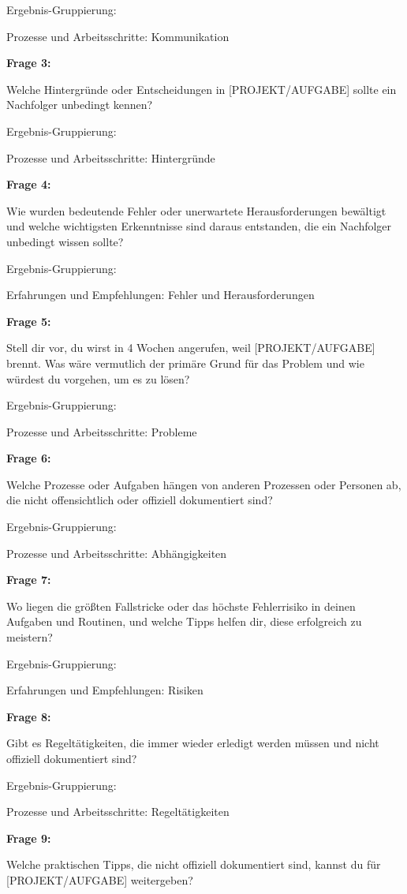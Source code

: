 \documentclass[
  10pt,
  ngerman,
  a4paper,
  toc=graduated,
  numbers=noenddot,
  headings=standardclasses,
  nonumberlist
]{scrartcl}
\begin{document}
Ergebnis-Gruppierung:

Prozesse und Arbeitsschritte: Kommunikation

\textbf{Frage 3:}

Welche Hintergründe oder Entscheidungen in [PROJEKT/AUFGABE] sollte ein Nachfolger unbedingt kennen?

Ergebnis-Gruppierung:

Prozesse und Arbeitsschritte: Hintergründe

\textbf{Frage 4:}

Wie wurden bedeutende Fehler oder unerwartete Herausforderungen bewältigt und welche wichtigsten Erkenntnisse sind daraus entstanden, die ein Nachfolger unbedingt wissen sollte?

Ergebnis-Gruppierung:

Erfahrungen und Empfehlungen: Fehler und Herausforderungen

\textbf{Frage 5:}

Stell dir vor, du wirst in 4 Wochen angerufen, weil [PROJEKT/AUFGABE] brennt. Was wäre vermutlich der primäre Grund für das Problem und wie würdest du vorgehen, um es zu lösen?

Ergebnis-Gruppierung:

Prozesse und Arbeitsschritte: Probleme

\textbf{Frage 6:}

Welche Prozesse oder Aufgaben hängen von anderen Prozessen oder Personen ab, die nicht offensichtlich oder offiziell dokumentiert sind?

Ergebnis-Gruppierung:

Prozesse und Arbeitsschritte: Abhängigkeiten

\textbf{Frage 7:}

Wo liegen die größten Fallstricke oder das höchste Fehlerrisiko in deinen Aufgaben und Routinen, und welche Tipps helfen dir, diese erfolgreich zu meistern?

Ergebnis-Gruppierung:

Erfahrungen und Empfehlungen: Risiken

\textbf{Frage 8:}

Gibt es Regeltätigkeiten, die immer wieder erledigt werden müssen und nicht offiziell dokumentiert sind?

Ergebnis-Gruppierung:

Prozesse und Arbeitsschritte: Regeltätigkeiten

\textbf{Frage 9:}

Welche praktischen Tipps, die nicht offiziell dokumentiert sind, kannst du für [PROJEKT/AUFGABE] weitergeben?
\end{document}
